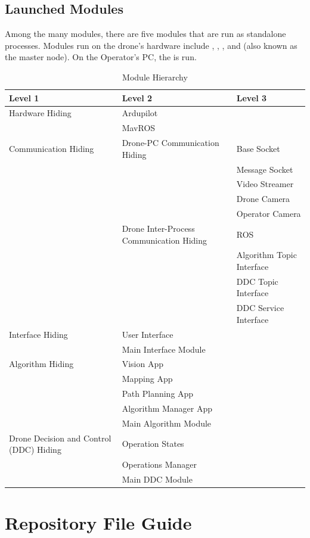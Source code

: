 \documentclass[12pt, titlepage]{article}
\begin{document}
\subsection{Launched Modules}
Among the many modules, there are five modules that are run as standalone processes. Modules run on the drone's hardware include , , , and  (also known as the master node). On the Operator's PC, the  is run.


\begin{table}[h!]
\centering
\begin{tabular}{p{} p{}  p{}}
\toprule
\textbf{Level 1} & \textbf{Level 2} & 
\textbf{Level 3}\\
\midrule
{Hardware Hiding} & 
Ardupilot \\
& MavROS \\
\midrule
Communication Hiding &
Drone-PC Communication Hiding & Base Socket \\
 && Message Socket \\
 && Video Streamer \\
 && Drone Camera \\
 && Operator Camera \\
 &{Drone Inter-Process Communication Hiding} 
& ROS \\
&& Algorithm Topic Interface \\
&& DDC Topic Interface \\
&& DDC Service Interface \\
\midrule
Interface Hiding
& User Interface \\
& Main Interface Module \\
\midrule
{Algorithm Hiding} 
& Vision App \\
& Mapping App \\
& Path Planning App \\
& Algorithm Manager App \\
& Main Algorithm Module \\
\midrule
{Drone Decision and Control (DDC) Hiding} 
& Operation States \\
& Operations Manager \\
& Main DDC Module \\
\midrule
\end{tabular}
\caption{Module Hierarchy}
\label{TblMH}
\end{table}


\section{Repository File Guide} \label{SecFG}
\end{document}
